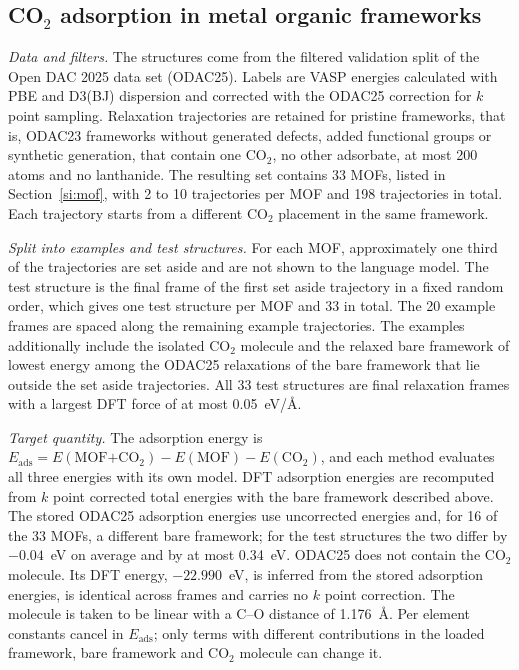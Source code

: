 \subsection{CO$_2$ adsorption in metal organic frameworks}
\label{si:app-mof}

\textit{Data and filters.} The structures come from the filtered validation split of the Open DAC 2025 data set (ODAC25).\cite{sriram2025odac25} Labels are VASP energies calculated with PBE and D3(BJ) dispersion and corrected with the ODAC25 correction for $k$ point sampling. Relaxation trajectories are retained for pristine frameworks, that is, ODAC23 frameworks without generated defects, added functional groups or synthetic generation, that contain one CO$_2$, no other adsorbate, at most 200 atoms and no lanthanide. The resulting set contains 33 MOFs, listed in Section~\ref{si:mof}, with 2 to 10 trajectories per MOF and 198 trajectories in total. Each trajectory starts from a different CO$_2$ placement in the same framework.

\textit{Split into examples and test structures.} For each MOF, approximately one third of the trajectories are set aside and are not shown to the language model. The test structure is the final frame of the first set aside trajectory in a fixed random order, which gives one test structure per MOF and 33 in total. The 20 example frames are spaced along the remaining example trajectories. The examples additionally include the isolated CO$_2$ molecule and the relaxed bare framework of lowest energy among the ODAC25 relaxations of the bare framework that lie outside the set aside trajectories. All 33 test structures are final relaxation frames with a largest DFT force of at most 0.05~eV/\AA.



\textit{Target quantity.} The adsorption energy is $E_\mathrm{ads} = E(\text{MOF+CO}_2) - E(\text{MOF}) - E(\mathrm{CO_2})$, and each method evaluates all three energies with its own model. DFT adsorption energies are recomputed from $k$ point corrected total energies with the bare framework described above. The stored ODAC25 adsorption energies use uncorrected energies and, for 16 of the 33 MOFs, a different bare framework; for the test structures the two differ by $-0.04$~eV on average and by at most 0.34~eV. ODAC25 does not contain the CO$_2$ molecule. Its DFT energy, $-22.990$~eV, is inferred from the stored adsorption energies, is identical across frames and carries no $k$ point correction. The molecule is taken to be linear with a C--O distance of 1.176~\AA. Per element constants cancel in $E_\mathrm{ads}$; only terms with different contributions in the loaded framework, bare framework and CO$_2$ molecule can change it.

